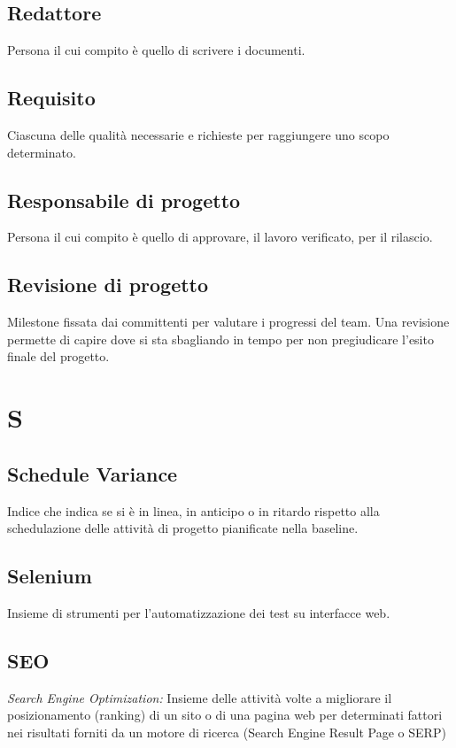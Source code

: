 \subsection*{Redattore}
Persona il cui compito è quello di scrivere i documenti.

\subsection*{Requisito}
Ciascuna delle qualità necessarie e richieste per raggiungere uno scopo determinato.

\subsection*{Responsabile di progetto}
Persona il cui compito è quello di approvare, il lavoro verificato, per il rilascio.

\subsection*{Revisione di progetto}
Milestone fissata dai committenti per valutare i progressi del team. Una revisione permette di capire dove si sta sbagliando in tempo per non pregiudicare l'esito finale del progetto.

\section*{S}
\subsection*{Schedule Variance}
Indice che indica se si è in linea, in anticipo o in ritardo rispetto alla schedulazione delle attività di progetto pianificate nella baseline.

\subsection*{Selenium}
Insieme di strumenti per l'automatizzazione dei test su interfacce web.

\subsection*{SEO}
\textit{Search Engine Optimization:} Insieme delle attività volte a migliorare il posizionamento (ranking) di un sito o di una pagina web per determinati fattori nei risultati forniti
da un motore di ricerca (Search Engine Result Page o SERP)

